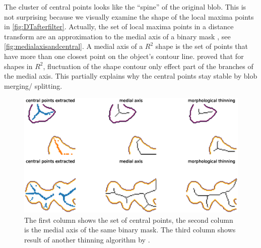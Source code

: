 The cluster of central points looks like the ``spine'' of the original blob. This is not surprising because we visually examine the shape of the local maxima points in \autoref{fig:DTafterfilter}. Actually, the set of local maxima points in a distance transform are an approximation to the medial axis of a binary mask \cite{lee1996chessboard}, see \autoref{fig:medialaxisandcentral}. A medial axis of a $R^2$ shape is the set of points that have more than one closest point on the object's contour line. \citeauthor{attali2009stability} \cite{attali2009stability} proved that for shapes in $R^2$, fluctuation of the shape contour only effect part of the branches of the medial axis. This partially explains why the central points stay stable by blob merging/ splitting.
\begin{figure}
  \centering
  \includegraphics[width=\textwidth]{figures/centralandmedial.eps}
  \caption{The first column shows the set of central points, the second column is the medial axis of the same binary mask. The third column shows result of another thinning algorithm by \cite{zhang1984fast}.}\label{fig:medialaxisandcentral}
\end{figure}



